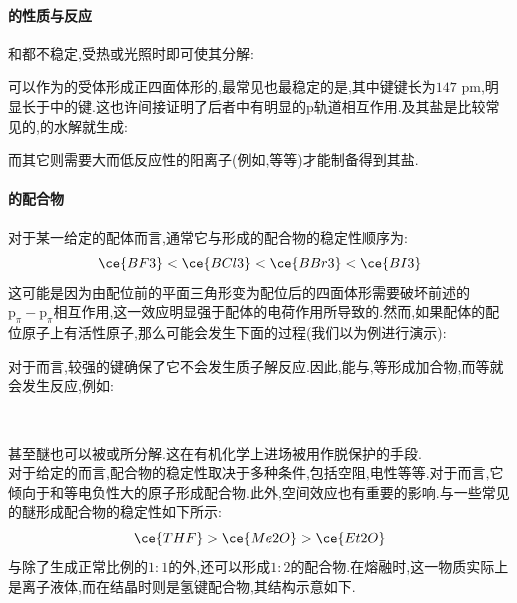 \documentclass{ctexart}
\begin{document}
\paragraph{的性质与反应}
和都不稳定,受热或光照时即可使其分解:
\begin{center}
\end{center}

\indent {}可以作为的受体形成正四面体形的,最常见也最稳定的是,其中键键长为$147\text{ pm}$,明显长于中的键.这也许间接证明了后者中有明显的p轨道相互作用.及其盐是比较常见的,的水解就生成:
\begin{center}
\end{center}
而其它则需要大而低反应性的阳离子(例如,等等)才能制备得到其盐.
\paragraph{的配合物}
对于某一给定的配体而言,通常它与形成的配合物的稳定性顺序为:
\[\ce{BF3}<\ce{BCl3}<\ce{BBr3}<\ce{BI3}\]
这可能是因为由配位前的平面三角形变为配位后的四面体形需要破坏前述的$\text{p}_\pi-\text{p}_\pi$相互作用,这一效应明显强于配体的电荷作用所导致的.然而,如果配体的配位原子上有活性原子,那么可能会发生下面的过程(我们以为例进行演示):
\begin{center}
\end{center}
对于而言,较强的键确保了它不会发生质子解反应.因此,能与,等形成加合物,而等就会发生反应,例如:
\begin{center}
    \\
\end{center}
甚至醚也可以被或所分解.这在有机化学上进场被用作脱保护的手段.\\
\indent 对于给定的而言,配合物的稳定性取决于多种条件,包括空阻,电性等等.对于而言,它倾向于和等电负性大的原子形成配合物.此外,空间效应也有重要的影响.与一些常见的醚形成配合物的稳定性如下所示:
\[\ce{THF}>\ce{Me2O}>\ce{Et2O}\]
\indent {}与除了生成正常比例的$1:1$的外,还可以形成$1:2$的配合物.在熔融时,这一物质实际上是离子液体\ce{[H3O]+[F3B(OH)]-},而在结晶时则是氢键配合物,其结构示意如下.
\end{document}
